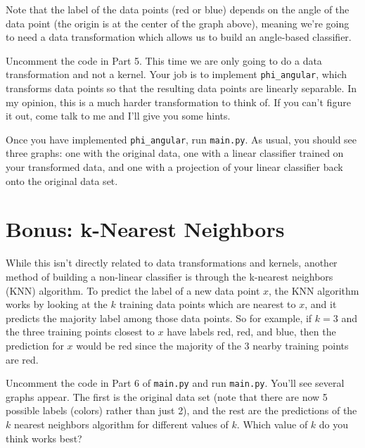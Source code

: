 \documentclass{article}
\begin{document}
Note that the label of the data points (red or blue) depends on the angle of the data point (the origin is at the center of the graph above), meaning we're going to need a data transformation which allows us to build an angle-based classifier.

\vspace{2mm}

Uncomment the code in Part 5. This time we are only going to do a data transformation and not a kernel. Your job is to implement \texttt{phi\_angular}, which transforms data points so that the resulting data points are linearly separable. In my opinion, this is a much harder transformation to think of. If you can't figure it out, come talk to me and I'll give you some hints.

Once you have implemented \texttt{phi\_angular}, run \texttt{main.py}. As usual, you should see three graphs: one with the original data, one with a linear classifier trained on your transformed data, and one with a projection of your linear classifier back onto the original data set.

\section{Bonus: k-Nearest Neighbors}

While this isn't directly related to data transformations and kernels, another method of building a non-linear classifier is through the k-nearest neighbors (KNN) algorithm. To predict the label of a new data point $x$, the KNN algorithm works by looking at the $k$ training data points which are nearest to $x$, and it predicts the majority label among those data points. So for example, if $k=3$ and the three training points closest to $x$ have labels red, red, and blue, then the prediction for $x$ would be red since the majority of the $3$ nearby training points are red.

Uncomment the code in Part 6 of \texttt{main.py} and run \texttt{main.py}. You'll see several graphs appear. The first is the original data set (note that there are now 5 possible labels (colors) rather than just 2), and the rest are the predictions of the $k$ nearest neighbors algorithm for different values of $k$. Which value of $k$ do you think works best?
\end{document}
